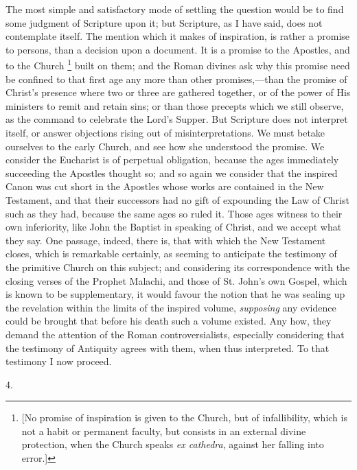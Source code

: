 The most simple and satisfactory mode of settling the question
would be to find some judgment of Scripture upon it; but Scripture, as
I have said, does not contemplate itself. The mention which it makes
of inspiration, is rather a promise to persons, than a decision upon a
document. It is a promise to the Apostles, and to the Church \footnote{[No promise of inspiration is given to the Church, but of
infallibility, which is not a habit or permanent faculty, but consists
in an external divine protection, when the Church speaks \emph{ex
cathedra}, against her falling into error.]}
built on them; and the Roman divines ask why this promise need be
confined to that first age any more than other promises,—than the
promise of Christ's presence where two or three are gathered
together, or of the power of His ministers to remit and retain sins;
or than those precepts which we still observe, as the command to
celebrate the Lord's Supper. But Scripture does not interpret
itself, or answer objections rising out of misinterpretations. We must betake ourselves to the early Church, and see how she
understood the promise. We consider the Eucharist is of perpetual
obligation, because the ages immediately succeeding the Apostles
thought so; and so again we consider that the inspired Canon was cut
short in the Apostles whose works are contained in the New Testament,
and that their successors had no gift of expounding the Law of Christ
such as they had, because the same ages so ruled it. Those ages
witness to their own inferiority, like John the Baptist in speaking of
Christ, and we accept what they say. One passage, indeed, there is,
that with which the New Testament closes, which is remarkable
certainly, as seeming to anticipate the testimony of the primitive
Church on this subject; and considering its correspondence with the
closing verses of the Prophet Malachi, and those of St. John's own
Gospel, which is known to be supplementary, it would favour the notion
that he was sealing up the revelation within the limits of the
inspired volume, \emph{supposing} any evidence could be brought that
before his death such a volume existed. Any how, they demand the
attention of the Roman controversialists, especially considering that
the testimony of Antiquity agrees with them, when thus interpreted. To
that testimony I now proceed.

4.

